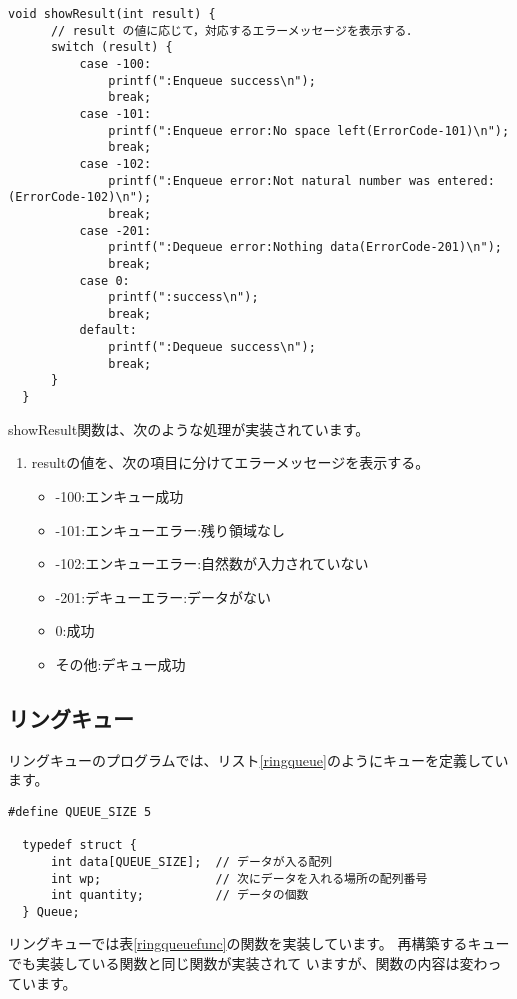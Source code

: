 \documentclass[a4j]{jarticle}
\begin{document}
\begin{lstlisting}[caption=再構築するキューのshowResult関数の実装,label=list:showResult]
  void showResult(int result) {
      // result の値に応じて，対応するエラーメッセージを表示する．
      switch (result) {
          case -100:
              printf(":Enqueue success\n");
              break;
          case -101:
              printf(":Enqueue error:No space left(ErrorCode-101)\n");
              break;
          case -102:
              printf(":Enqueue error:Not natural number was entered:(ErrorCode-102)\n");
              break;
          case -201:
              printf(":Dequeue error:Nothing data(ErrorCode-201)\n");
              break;
          case 0:
              printf(":success\n");
              break;
          default:
              printf(":Dequeue success\n");
              break;
      }
  }
\end{lstlisting}

showResult関数は、次のような処理が実装されています。
\begin{enumerate}
  \item resultの値を、次の項目に分けてエラーメッセージを表示する。
        \begin{itemize}
          \item -100:エンキュー成功
          \item -101:エンキューエラー:残り領域なし
          \item -102:エンキューエラー:自然数が入力されていない
          \item -201:デキューエラー:データがない
          \item 0:成功
          \item その他:デキュー成功
        \end{itemize}
\end{enumerate}

\subsection{リングキュー}
リングキューのプログラムでは、リスト\ref{ringqueue}のようにキューを定義しています。
\begin{lstlisting}[caption=リングキュープログラムのキューの定義,label=ringqueue]
  #define QUEUE_SIZE 5

  typedef struct {
      int data[QUEUE_SIZE];  // データが入る配列
      int wp;                // 次にデータを入れる場所の配列番号
      int quantity;          // データの個数
  } Queue;
\end{lstlisting}
リングキューでは表\ref{ringqueuefunc}の関数を実装しています。
再構築するキューでも実装している関数と同じ関数が実装されて
いますが、関数の内容は変わっています。
\end{document}
